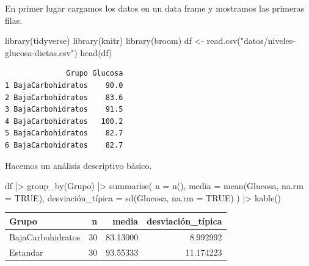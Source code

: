 \documentclass[
  a4paper,
]{scrreport}
\newenvironment{Shaded}{\begin{snugshade}}{\end{snugshade}}
\newcommand{\AttributeTok}[1]{\textcolor[rgb]{0.40,0.45,0.13}{#1}}
\newcommand{\ConstantTok}[1]{\textcolor[rgb]{0.56,0.35,0.01}{#1}}
\newcommand{\FunctionTok}[1]{\textcolor[rgb]{0.28,0.35,0.67}{#1}}
\newcommand{\NormalTok}[1]{\textcolor[rgb]{0.00,0.23,0.31}{#1}}
\newcommand{\OtherTok}[1]{\textcolor[rgb]{0.00,0.23,0.31}{#1}}
\newcommand{\SpecialCharTok}[1]{\textcolor[rgb]{0.37,0.37,0.37}{#1}}
\newcommand{\StringTok}[1]{\textcolor[rgb]{0.13,0.47,0.30}{#1}}
\theoremstyle{definition}
\theoremstyle{remark}
\begin{document}
\begin{tcolorbox}[enhanced jigsaw, breakable, opacityback=0, colbacktitle=quarto-callout-tip-color!10!white, colframe=quarto-callout-tip-color-frame, left=2mm, titlerule=0mm, coltitle=black, colback=white, bottomtitle=1mm, toptitle=1mm, opacitybacktitle=0.6, title=\textcolor{quarto-callout-tip-color}{\faLightbulb}\hspace{0.5em}{Solución}, leftrule=.75mm, bottomrule=.15mm, toprule=.15mm, rightrule=.15mm, arc=.35mm]

En primer lugar cargamos los datos en un data frame y mostramos las
primeras filas.

\begin{Shaded}
\begin{Highlighting}[]
\FunctionTok{library}\NormalTok{(tidyverse)}
\FunctionTok{library}\NormalTok{(knitr)}
\FunctionTok{library}\NormalTok{(broom)}
\NormalTok{df }\OtherTok{\textless{}{-}} \FunctionTok{read.csv}\NormalTok{(}\StringTok{"datos/niveles{-}glucosa{-}dietas.csv"}\NormalTok{)}
\FunctionTok{head}\NormalTok{(df)}
\end{Highlighting}
\end{Shaded}

\begin{verbatim}
              Grupo Glucosa
1 BajaCarbohidratos    90.0
2 BajaCarbohidratos    83.6
3 BajaCarbohidratos    91.5
4 BajaCarbohidratos   100.2
5 BajaCarbohidratos    82.7
6 BajaCarbohidratos    82.7
\end{verbatim}

Hacemos un análisis descriptivo básico.

\begin{Shaded}
\begin{Highlighting}[]
\NormalTok{df }\SpecialCharTok{|\textgreater{}} 
    \FunctionTok{group\_by}\NormalTok{(Grupo) }\SpecialCharTok{|\textgreater{}} 
    \FunctionTok{summarise}\NormalTok{(}
        \AttributeTok{n =} \FunctionTok{n}\NormalTok{(),}
        \AttributeTok{media =} \FunctionTok{mean}\NormalTok{(Glucosa, }\AttributeTok{na.rm =} \ConstantTok{TRUE}\NormalTok{),}
\NormalTok{        desviación\_típica }\OtherTok{=} \FunctionTok{sd}\NormalTok{(Glucosa, }\AttributeTok{na.rm =} \ConstantTok{TRUE}\NormalTok{)}
\NormalTok{    ) }\SpecialCharTok{|\textgreater{}} 
    \FunctionTok{kable}\NormalTok{()}
\end{Highlighting}
\end{Shaded}

\begin{longtable}[]{@{}lrrr@{}}
\toprule\noalign{}
Grupo & n & media & desviación\_típica \\
\midrule\noalign{}
\endhead
\bottomrule\noalign{}
\endlastfoot
BajaCarbohidratos & 30 & 83.13000 & 8.992992 \\
Estandar & 30 & 93.55333 & 11.174223 \\
\end{longtable}


\end{tcolorbox}
\end{document}
